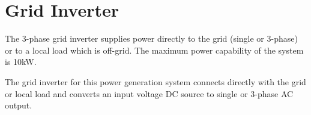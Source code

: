 \section{Grid Inverter}
\label{ch:grid_inverter}

The 3-phase grid inverter supplies power directly to the grid (single or 3-phase) or to a local load which is off-grid. The maximum power capability of the system is 10kW. \newline

The grid inverter for this power generation system connects directly with the grid or local load and converts an input voltage DC source to single or 3-phase AC output. \newline

\newpage

\begin{figure}
	
\end{figure}

